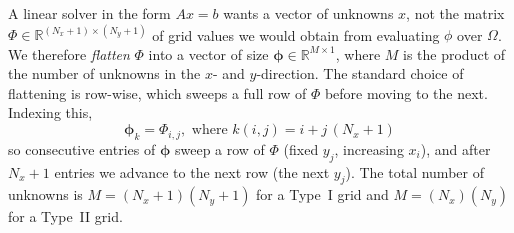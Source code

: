 A linear solver in the form $Ax = b$ wants a vector of unknowns $x$, not the matrix $\Phi \in \mathbb{R}^{(N_x + 1) \times (N_y + 1)}$ of grid values we would obtain from evaluating $\phi$ over $\Omega$. We therefore \emph{flatten} $\Phi$ into a vector of size $\boldsymbol{\phi} \in\mathbb{R}^{M \times 1}$, where $M$ is the product of the number of unknowns in the $x$- and $y$-direction. The standard choice of flattening is row-wise, which sweeps a full row of $\Phi$ before moving to the next. Indexing this,
\begin{equation}
    \boldsymbol{\phi}_{k} = \Phi_{i,j},
     \text{   where    } k (i,j) = i + j\,(N_x+1)
    \label{eq:order}
\end{equation}
so consecutive entries of $\boldsymbol{\phi}$ sweep a row of $\Phi$ (fixed $y_j$, increasing $x_i$), and after
$N_x+1$ entries we advance to the next row (the next $y_j$). The total number
of unknowns  is $M=(N_x+1)(N_y+1)$ for a Type~I grid and $M=(N_x)(N_y)$ for a Type~II grid.

